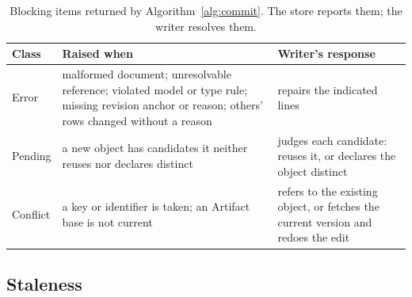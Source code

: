 \documentclass[sigconf,review,anonymous]{acmart}
\begin{document}
\begin{table}[tbp]
\caption{Blocking items returned by Algorithm~\ref{alg:commit}. The store
reports them; the writer resolves them.}
\label{tab:blocking}
\small
\begin{tabular}{@{}>{\raggedright\arraybackslash}p{}>{\raggedright\arraybackslash}p{}>{\raggedright\arraybackslash}p{}@{}}
\toprule
Class & Raised when & Writer's response \\
\midrule
Error & malformed document; unresolvable reference; violated model or type
rule; missing revision anchor or reason; others' rows changed without a reason
& repairs the indicated lines \\
Pending & a new object has candidates it neither reuses nor declares distinct
& judges each candidate: reuses it, or declares the object distinct \\
Conflict & a key or identifier is taken; an Artifact base is not current
& refers to the existing object, or fetches the current version and redoes
the edit \\
\bottomrule
\end{tabular}
\end{table}

\subsection{Staleness}
\label{sec:staleness-draft}
\end{document}
